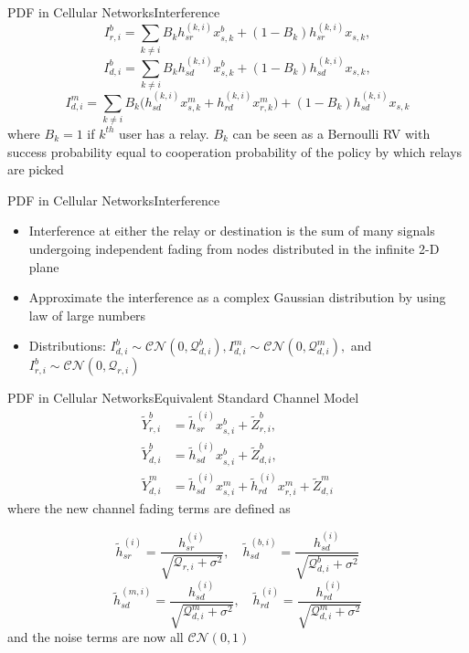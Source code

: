 \documentclass{beamer}
\begin{document}
\begin{frame}{PDF in Cellular Networks}{Interference}
\begin{equation*} 
I_{r,i}^b = \sum_{k \neq i} B_k h^{(k,i)}_{sr} x_{s,k}^b + (1-B_k)h_{sr}^{(k,i)}x_{s,k} ,
\end{equation*}
\begin{equation*}
I_{d,i}^b = \sum_{k \neq i} B_k h_{sd}^{(k,i)} x^b_{s,k} + (1-B_k)h_{sd}^{(k,i)}x_{s,k},
\end{equation*}
\begin{equation*} \label{eq:interferences}
I_{d,i}^m = \sum_{k \neq i} B_k \Big(h_{sd}^{(k,i)} x^m_{s,k} + h_{rd}^{(k,i)} x^m_{r,k}\Big) + (1-B_k)h_{sd}^{(k,i)}x_{s,k}
\end{equation*}
where $B_k = 1$ if $k^{th}$ user has a relay. $B_k$ can be seen as a Bernoulli RV with success probability equal to cooperation probability of the policy by which relays are picked  
\end{frame}

\begin{frame}{PDF in Cellular Networks}{Interference}
\begin{itemize}
\item Interference at either the relay or destination is the
sum of many signals undergoing independent fading from nodes distributed in the infinite 2-D plane
\item Approximate the interference as a complex Gaussian distribution by using law of large numbers
\item Distributions: $ I_{d,i}^b \sim \mathcal{CN} (0,\mathcal{Q}_{d,i}^b), I_{d,i}
^m \sim \mathcal{CN}(0,\mathcal{Q}_{d,i}^m),$ and $I_{r,i}^b \sim \mathcal{CN}
(0,\mathcal{Q}_{r,i})$
\end{itemize}
\end{frame}

\begin{frame}{PDF in Cellular Networks}{Equivalent Standard Channel Model}
\begin{align*}
\tilde{Y}_{r,i}^b &= \tilde{h}_{sr}^{(i)}x_{s,i}^b + \tilde{Z}_{r,i}^b, \\
\tilde{Y}_{d,i}^b &= \tilde{h}_{sd}^{(i)}x_{s,i}^b + \tilde{Z}_{d,i}^b, \\
\tilde{Y}_{d,i}^m &= \tilde{h}_{sd}^{(i)}x_{s,i}^m + \tilde{h}_{rd}^{(i)}x_{r,i}^m + \tilde{Z}_{d,i}^m
\end{align*}
where the new channel fading terms are defined as

\begin{equation*}
\tilde{h}_{sr}^{(i)} = \frac{h_{sr}^{(i)}}{\sqrt{\mathcal{Q}_{r,i} + \sigma^2}}, \quad \tilde{h}_{sd}^{(b,i)} = \frac{h_{sd}^{(i)}}{\sqrt{\mathcal{Q}_{d,i}^b + \sigma^2}} 
\end{equation*}
\begin{equation*}
\tilde{h}_{sd}^{(m,i)} = \frac{h_{sd}^{(i)}}{\sqrt{\mathcal{Q}_{d,i}^m + \sigma^2}},
\quad \tilde{h}_{rd}^{(i)} = \frac{h_{rd}^{(i)}}{\sqrt{\mathcal{Q}_{d,i}^m + \sigma^2}}
\end{equation*}
and the noise terms are now all $\mathcal{CN}(0,1)$
\end{frame}
\end{document}
